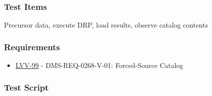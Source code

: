 \hypertarget{test-items-42}{%
\subsubsection{Test Items}\label{test-items-42}}

Precursor data, execute DRP, load results, observe catalog contents

\hypertarget{requirements-43}{%
\subsubsection{Requirements}\label{requirements-43}}

\begin{itemize}
\tightlist
\item
  \href{https://jira.lsstcorp.org/browse/LVV-99}{LVV-99} -
  DMS-REQ-0268-V-01: Forced-Source Catalog
\end{itemize}

\hypertarget{test-script-43}{%
\subsubsection{Test Script}\label{test-script-43}}

